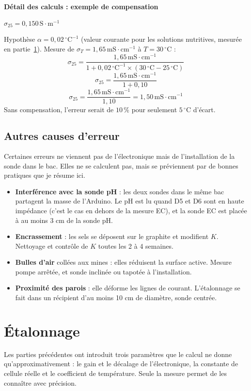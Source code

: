\documentclass[11pt,a4paper]{article}
\newcommand{\resultat}[1]{\begin{center}{\large\color{bleuENO}$\displaystyle #1$}\end{center}}
\newcommand{\calcul}[2]{\par\medskip\noindent\textbf{Détail des calculs : #1}\par\nopagebreak\resultat{#2}}
\newcommand{\U}[1]{\,\mathrm{#1}}
\begin{document}
\calcul{exemple de compensation}{\sigma_{25} = 0{,}150\,\mathrm{S \cdot m^{-1}}}
Hypothèse $\alpha = 0{,}02\U{{}^{\circ}C^{-1}}$ (valeur courante pour les solutions nutritives, mesurée en partie~\ref{sec:etalonnage}). Mesure de $\sigma_T = 1{,}65\U{mS \cdot cm^{-1}}$ à $T = 30\U{{}^{\circ}C}$ :
\[
\sigma_{25} = \frac{1{,}65\U{mS \cdot cm^{-1}}}{1 + 0{,}02\U{{}^{\circ}C^{-1}} \times (30\U{{}^{\circ}C} - 25\U{{}^{\circ}C})}
\]
\[
\sigma_{25} = \frac{1{,}65\U{mS \cdot cm^{-1}}}{1 + 0{,}10}
\]
\[
\sigma_{25} = \frac{1{,}65\U{mS \cdot cm^{-1}}}{1{,}10} = 1{,}50\U{mS \cdot cm^{-1}}
\]
Sans compensation, l'erreur serait de $10\U{\%}$ pour seulement $5\U{{}^{\circ}C}$ d'écart.

\subsection{Autres causes d'erreur}

Certaines erreurs ne viennent pas de l'électronique mais de l'installation de la sonde dans le bac. Elles ne se calculent pas, mais se préviennent par de bonnes pratiques que je résume ici.


\begin{itemize}[nosep]
\item \textbf{Interférence avec la sonde pH} : les deux sondes dans le même bac partagent la masse de l'Arduino. Le pH est lu quand D5 et D6 sont en haute impédance (c'est le cas en dehors de la mesure EC), et la sonde EC est placée à au moins 3 cm de la sonde pH.
\item \textbf{Encrassement} : les sels se déposent sur le graphite et modifient $K$. Nettoyage et contrôle de $K$ toutes les 2 à 4 semaines.
\item \textbf{Bulles d'air} collées aux mines : elles réduisent la surface active. Mesure pompe arrêtée, et sonde inclinée ou tapotée à l'installation.
\item \textbf{Proximité des parois} : elle déforme les lignes de courant. L'étalonnage se fait dans un récipient d'au moins 10 cm de diamètre, sonde centrée.
\end{itemize}

\newpage
\section{Étalonnage}
\label{sec:etalonnage}

Les parties précédentes ont introduit trois paramètres que le calcul ne donne qu'approximativement : le gain et le décalage de l'électronique, la constante de cellule réelle et le coefficient de température. Seule la mesure permet de les connaître avec précision.
\end{document}
